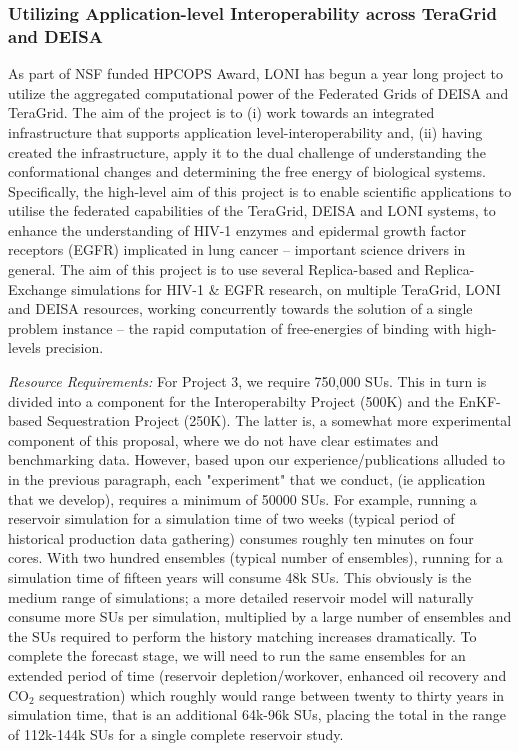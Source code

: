 \documentclass[a4paper,10pt]{article}
\begin{document}
\subsubsection*{Utilizing Application-level Interoperability across TeraGrid and DEISA}
As part of NSF funded HPCOPS Award, LONI has begun a year long project to utilize the aggregated computational power of the Federated Grids of DEISA and TeraGrid. The aim of the project is to (i) work towards an integrated infrastructure that supports application level-interoperability and, (ii) having created the infrastructure, apply it to the dual challenge of understanding the conformational changes and determining the free energy of biological systems. Specifically, the high-level aim of this project is to enable scientific applications to utilise the federated capabilities of the TeraGrid, DEISA and LONI systems, to enhance the understanding of HIV-1 enzymes and epidermal growth factor receptors (EGFR) implicated in lung cancer -- important science drivers in general. The aim of this project is to use several Replica-based and Replica-Exchange simulations for HIV-1 \& EGFR research, on multiple TeraGrid, LONI and DEISA resources, working concurrently towards the solution of a single problem instance -- the rapid computation of free-energies of binding with high-levels precision.

{\it Resource Requirements:} For Project 3, we require 750,000 SUs. This in turn is divided into a component for the Interoperabilty Project (500K) and the EnKF-based Sequestration Project (250K). The latter is, a somewhat more experimental component of this proposal, where we do not have clear estimates and benchmarking data. However, based upon our experience/publications alluded to in the previous paragraph, each "experiment" that we conduct, (ie application that we develop), requires a minimum of 50000 SUs. For example, running a reservoir simulation for a simulation time of two weeks (typical period of historical production data gathering) consumes roughly ten minutes on four cores.  With two hundred ensembles (typical number of ensembles), running for a simulation time of fifteen years will consume 48k SUs. This obviously is the medium range of simulations; a more detailed reservoir model will naturally consume more SUs per simulation, multiplied by a large number of ensembles and the SUs required to perform the history matching increases dramatically. To complete the forecast stage, we will need to run the same ensembles for an extended period of time (reservoir depletion/workover, enhanced oil recovery and CO$_2$ sequestration) which roughly would range between twenty to thirty years in simulation time, that is an additional 64k-96k SUs, placing the total in the range of 112k-144k SUs for a single complete reservoir study.
\end{document}
